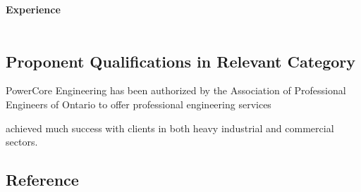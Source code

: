 \textbf{Experience}\\
\\	
\pagebreak
\subsection{Proponent Qualifications in Relevant Category}
\label{Sub:Qual}

\noindent PowerCore Engineering has been authorized by the Association of Professional Engineers of Ontario to offer professional engineering services

achieved much success with clients in both heavy industrial and commercial sectors. \\

\subsection{Reference}
\label{Sub:Ref}





